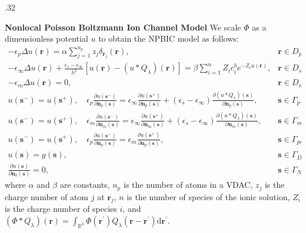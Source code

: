 \documentclass[10pt]{beamer}
\newcommand{\rr}{{\mathbf r}}
\newcommand{\s}{{\mathbf s}}
\newcommand{\nn}{{\mathbf n}}
\newcommand{\rp}{{\mathbf r}^{\prime}}
\begin{document}
\begin{frame}{}
\begin{columns}[t]
\begin{column}{.32\linewidth}
\begin{block}{\centering \bf \large Nonlocal Poisson Boltzmann Ion Channel Model}
                We scale $\Phi$ as a dimensionless potential $u$ to obtain the NPBIC model as follows:
                    \begin{equation*}
                    \label{NMPBic_u}
                     \begin{array}{cl}
                         -\epsilon_p\Delta u(\rr) =\alpha \sum\limits_{j=1}^{n_{p}}z_{j}  \delta_{\rr_{j}}(\rr), & \rr \in D_p,\\
                    -\epsilon_{\infty}\Delta u(\rr) + \frac{\epsilon_s-\epsilon_\infty}{\lambda^2}[u(\rr)-(u\ast Q_{\lambda})(\rr)]
                    = \beta \sum\limits_{i=1}^{n}Z_{i} c_{i}^{b} e^{-Z_{i} u(\rr)}, & \rr \in D_s,\\
                    -\epsilon_m \Delta u(\rr) = 0, & \rr \in D_m, \\
                    u(\s^{-}) = u(\s^{+}), \quad
                    \epsilon_p\frac{\partial u(\s^{-})}{\partial \nn_p(\s)} = \epsilon_\infty\frac{\partial u(\s^{+})}{\partial \nn_p(\s)}+(\epsilon_s-\epsilon_\infty)\frac{\partial (u\ast Q_{\lambda})(\s)}{\partial \nn_p(\s)}, & \s\in\Gamma_p,\\
                    u(\s^{-}) = u(\s^{+}), \quad \epsilon_m\frac{\partial u(\s^{-})}{\partial \nn_m(\s)} = \epsilon_\infty\frac{\partial u(\s^{+})}{\partial \nn_m(\s)}+(\epsilon_s-\epsilon_\infty)\frac{\partial (u\ast Q_{\lambda})(\s)}{\partial \nn_m(\s)}, & \s\in\Gamma_m,\\
                    u(\s^{-}) = u(\s^{+}), \quad  \epsilon_p\frac{\partial u(\s^{-})}{\partial \nn_p(\s)} = \epsilon_m\frac{\partial u(\s^{+})}{\partial \nn_p(\s)}, \quad &\s \in \Gamma_{pm}, \\
                       u(\s) = g(\s), & \s \in \Gamma_D, \\
                       \frac{\partial u (\s)}{\partial \nn_b(\s)} = 0, & \s \in \Gamma_N,
                    \end{array}
                    \end{equation*}  
                    where $\alpha$ and $\beta$ are constants, $n_p$ is the number of atoms in a VDAC, $z_j$ is the charge number of atom $j$ at $\rr_j$, $n$ is the number of species of the ionic solution, $Z_i$ is the charge number of species $i$, and $(\Phi * Q_\lambda)(\rr) = \int_{\mathbb{R}^3}\Phi(\rp)Q_\lambda(\rr-\rp) \mathrm{d}\rp$. 
                    

\end{block}
\end{column}
\end{columns}
\end{frame}
\end{document}
